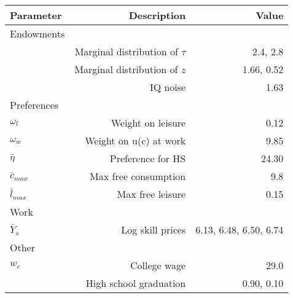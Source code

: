 \begin{tabular}{lrr}
\hline
Parameter & Description  & Value  \\ 
\hline
Endowments &   &   \\ 
 & Marginal distribution of $\tau$  & 2.4, 2.8  \\ 
 & Marginal distribution of $z$  & 1.66, 0.52  \\ 
 & IQ noise  & 1.63  \\ 
Preferences &   &   \\ 
$\omega_{l}$ & Weight on leisure  & 0.12  \\ 
$\omega_{w}$ & Weight on u(c) at work  & 9.85  \\ 
$\bar{\eta}$ & Preference for HS  & 24.30  \\ 
$\bar{c}_{max}$ & Max free consumption  & 9.8  \\ 
$\bar{l}_{max}$ & Max free leisure  & 0.15  \\ 
Work &   &   \\ 
$\bar{Y}_{s}$ & Log skill prices  & 6.13, 6.48, 6.50, 6.74  \\ 
Other &   &   \\ 
$w_{c}$ & College wage  & 29.0  \\ 
 & High school graduation  & 0.90, 0.10  \\ 
\hline
\end{tabular}%
